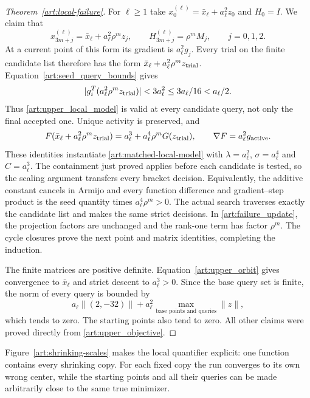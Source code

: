\begin{proof}[Theorem~\ref{art:local-failure}]
For $\ell\ge1$ take $x_0^{(\ell)}=\bar x_\ell+a_\ell^2z_0$ and $H_0=I$. We claim that
\begin{equation}\label{art:upper_orbit}
 x_{3m+j}^{(\ell)}=\bar x_\ell+a_\ell^2\rho^mz_j,\qquad
 H_{3m+j}^{(\ell)}=\rho^mM_j,\qquad j=0,1,2.
\end{equation}
At a current point of this form its gradient is $a_\ell^2g_j$. Every trial
on the finite candidate list therefore has the form
$\bar x_\ell+a_\ell^2\rho^mz_{\rm trial}$. Equation~\eqref{art:seed_query_bounds}
gives
\[
 |g_i^T(a_\ell^2\rho^mz_{\rm trial})|<3a_\ell^2
 \le3a_\ell/16<a_\ell/2.
\]
Thus \eqref{art:upper_local_model} is valid at every candidate query,
not only the final accepted one. Unique activity is preserved, and
\[
 F(\bar x_\ell+a_\ell^2\rho^mz_{\rm trial})
   =a_\ell^3+a_\ell^4\rho^mG(z_{\rm trial}),\qquad
 \nabla F=a_\ell^2g_{\rm active}.
\]
These identities instantiate \eqref{art:matched-local-model} with
$\lambda=a_\ell^2$, $\sigma=a_\ell^4$ and $C=a_\ell^3$. The containment just
proved applies before each candidate is tested, so the scaling argument
transfers every bracket decision. Equivalently, the additive constant
cancels in Armijo and every function difference and gradient--step product
is the seed quantity times $a_\ell^4\rho^m>0$. The actual search traverses
exactly the candidate list and makes the same strict decisions.
In \eqref{art:failure_update}, the projection factors are unchanged and
the rank-one term has factor $\rho^m$. The cycle closures prove the next
point and matrix identities, completing the induction.

The finite matrices are positive definite. Equation~\eqref{art:upper_orbit}
gives convergence to $\bar x_\ell$ and strict descent to $a_\ell^3>0$.
Since the base query set is finite, the norm of every query is bounded by
\[
 a_\ell\|(2,-32)\|+a_\ell^2\max_{\text{base points and queries}}\|z\|,
\]
which tends to zero. The starting points also tend to zero. All other
claims were proved directly from \eqref{art:upper_objective}.
\end{proof}


Figure~\ref{art:shrinking-scales} makes the local quantifier explicit:
one function contains every shrinking copy. For each fixed copy the run
converges to its own wrong center, while the starting points and all their
queries can be made arbitrarily close to the same true minimizer.

